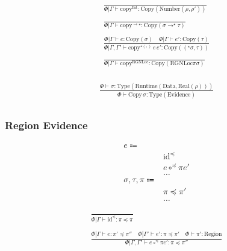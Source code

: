 \documentclass {article}
\begin{document}
\begin{gather*}
\frac
{}
{\Phi | \Gamma \vdash \text{copy}^\text{Int}  : \text{Copy} (\text{Number} (\rho, \rho'))} \\
\\
\frac
{}
{\Phi | \Gamma \vdash \text{copy}^{\to\star} : \text{Copy} (\sigma \to^\star \tau)} \\
\\
\frac
{\Phi | \Gamma \vdash e : \text{Copy} (\sigma) \quad \Phi | \Gamma \vdash e' : \text{Copy} (\tau)}
{\Phi | \Gamma, \Gamma' \vdash \text{copy}^{\star(,)} \, e \, e' : \text{Copy} ((^\star\sigma, \tau))} \\
\\
\frac
{}
{\Phi | \Gamma \vdash \text{copy}^\text{RGNLoc} : \text{Copy} (\text{RGNLoc} \pi \sigma)} \\
\end{gather*}

\begin{gather*}
\frac
{\Phi \vdash \sigma : \text{Type}(\text{Runtime}(\text{Data}, \text{Real}(\rho)))}
{\Phi \vdash \text{Copy} \, \sigma : \text{Type}(\text{Evidence})} \\
\end{gather*}


\subsubsection{Region Evidence}
\begin{align*}
e \Coloneqq & \\
& \text{id}^\preceq \tag{SubType Identity Proof} \\
& e \circ^\preceq \pi e' \tag{SubType Compose Proof} \\
& \dots \\
\sigma, \tau, \pi \Coloneqq & \\
& \pi \preceq \pi' \tag{Region Scoping} \\
& \dots
\end{align*}

\begin{gather*}
\frac
{}
{\Phi | \Gamma \vdash \text{id}^{\preceq}  : \pi \preceq \pi} \\
\\
\frac
{\Phi | \Gamma \vdash e : \pi' \preceq \pi'' \quad \Phi | \Gamma' \vdash e' : \pi \preceq \pi' \quad \Phi \vdash \pi' : \text{Region}}
{\Phi | \Gamma, \Gamma' \vdash e \circ^\preceq \pi e' : \pi \preceq \pi''} \\
\end{gather*}
\end{document}
